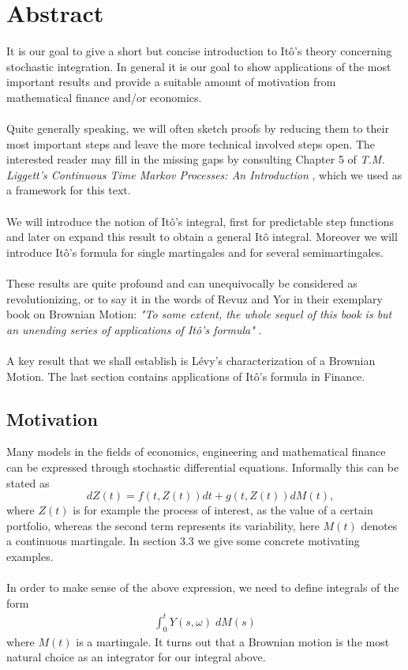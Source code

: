 \documentclass[11pt,a4paper, final]{article}
\begin{document}
\section{Abstract}
It is our goal to give a short but concise introduction to Itô's theory concerning stochastic integration. In general it is our goal to show applications of the most important results and provide a suitable amount of motivation from mathematical finance and/or economics. 
\\\\
Quite generally speaking, we will often sketch proofs by reducing them to their most important steps and leave the more technical involved steps open. The interested reader may fill in the missing gaps by consulting  Chapter 5 of \textit{T.M. Liggett's Continuous Time Markov Processes: An Introduction} \cite{Liggett}, which we used as a framework for this text. 
\\\\
We will introduce the notion of Itô's integral, first for predictable step functions and later on expand this result to obtain a general Itô integral. Moreover we will introduce Itô's formula for single martingales and for several semimartingales.
\\\\
\noindent These results are quite profound and can unequivocally be considered as revolutionizing, or to say it in the words of Revuz and Yor in their exemplary book on Brownian Motion: \textit{"To some extent, the whole sequel of this book is but an unending series of applications of Itô's formula"} \cite[page ~140]{RevuzYor}.
\\\\
A key result that we shall establish is Lévy's characterization of a Brownian Motion. The last section contains applications of Itô's formula in Finance. 
\subsection{Motivation}
\noindent Many models in the fields of economics, engineering and mathematical finance can be expressed through stochastic differential equations. Informally this can be stated as
$$ \quad dZ(t) = f(t, Z(t))dt + g(t,Z(t)) dM(t), $$
where $Z(t)$ is for example the process of interest, as the value of a certain portfolio, whereas the second term represents its variability, here $M(t)$ denotes a continuous martingale. In section 3.3 we give some concrete motivating examples. \\
\\
In order to make sense of the above expression, we need to define integrals of the form
\begin{align*} \int_0^t Y(s,\omega) \; dM(s) \tag{$\star$} 
\end{align*}
where $M(t)$ is a martingale. It turns out that a Brownian motion is the most natural choice as an integrator for our integral above. 
\newpage 
\end{document}
